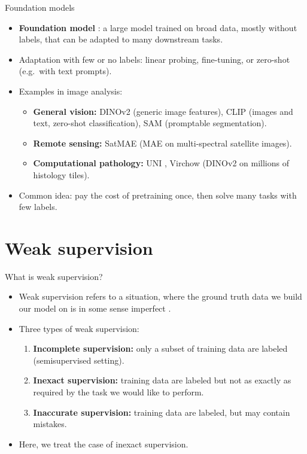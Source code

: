 \documentclass[xcolor=pdftex,dvipsnames,table]{beamer}
\begin{document}
\begin{frame}{Foundation models}
\begin{itemize}
\item \textbf{Foundation model} \cite{Bommasani2021}: a large model trained on broad data, mostly without labels, that can be adapted to many downstream tasks.
\item Adaptation with few or no labels: linear probing, fine-tuning, or zero-shot (e.g.\ with text prompts).
\item Examples in image analysis:
\begin{itemize}
   \item \textbf{General vision:} DINOv2 \cite{Oquab2024} (generic image features), CLIP \cite{Radford2021} (images and text, zero-shot classification), SAM \cite{Kirillov2023} (promptable segmentation).
   \item \textbf{Remote sensing:} SatMAE \cite{Cong2022} (MAE on multi-spectral satellite images).
   \item \textbf{Computational pathology:} UNI \cite{Chen2024}, Virchow \cite{Vorontsov2024} (DINOv2 on millions of histology tiles).
\end{itemize}
\item Common idea: pay the cost of pretraining once, then solve many tasks with few labels.
\end{itemize}
\end{frame}



\section{Weak supervision}

\begin{frame}{What is weak supervision?}
\begin{itemize}
\item Weak supervision refers to a situation, where the ground truth data we build our model on is in some sense imperfect \cite{Zhou2018}. 
\item Three types of weak supervision:
\begin{enumerate}
\item \textbf{Incomplete supervision:} only a subset of training data are labeled (semisupervised setting).
\item \textbf{Inexact supervision:} training data are labeled but not as exactly as required by the task we would like to perform.
\item \textbf{Inaccurate supervision:} training data are labeled, but may contain mistakes. 
\end{enumerate}
\item Here, we treat the case of inexact supervision. 
\end{itemize}
\end{frame}
\end{document}

